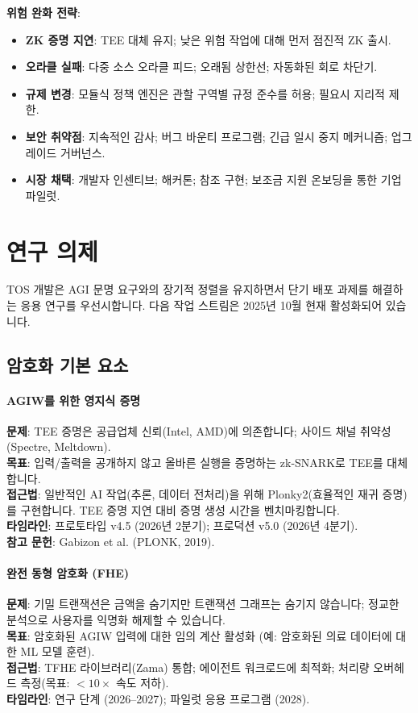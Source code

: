 \documentclass[11pt]{article}
\begin{document}
\textbf{위험 완화 전략}:
\begin{itemize}[noitemsep]
  \item \textbf{ZK 증명 지연}: TEE 대체 유지; 낮은 위험 작업에 대해 먼저 점진적 ZK 출시.
  \item \textbf{오라클 실패}: 다중 소스 오라클 피드; 오래됨 상한선; 자동화된 회로 차단기.
  \item \textbf{규제 변경}: 모듈식 정책 엔진은 관할 구역별 규정 준수를 허용; 필요시 지리적 제한.
  \item \textbf{보안 취약점}: 지속적인 감사; 버그 바운티 프로그램; 긴급 일시 중지 메커니즘; 업그레이드 거버넌스.
  \item \textbf{시장 채택}: 개발자 인센티브; 해커톤; 참조 구현; 보조금 지원 온보딩을 통한 기업 파일럿.
\end{itemize}

\section{연구 의제}
\label{sec:research}

TOS 개발은 AGI 문명 요구와의 장기적 정렬을 유지하면서 단기 배포 과제를 해결하는 응용 연구를 우선시합니다. 다음 작업 스트림은 2025년 10월 현재 활성화되어 있습니다.

\subsection{암호화 기본 요소}

\paragraph{AGIW를 위한 영지식 증명}
\textbf{문제}: TEE 증명은 공급업체 신뢰(Intel, AMD)에 의존합니다; 사이드 채널 취약성(Spectre, Meltdown).\\
\textbf{목표}: 입력/출력을 공개하지 않고 올바른 실행을 증명하는 zk-SNARK로 TEE를 대체합니다.\\
\textbf{접근법}: 일반적인 AI 작업(추론, 데이터 전처리)을 위해 Plonky2(효율적인 재귀 증명)를 구현합니다. TEE 증명 지연 대비 증명 생성 시간을 벤치마킹합니다.\\
\textbf{타임라인}: 프로토타입 v4.5 (2026년 2분기); 프로덕션 v5.0 (2026년 4분기).\\
\textbf{참고 문헌}: Gabizon et al. (PLONK, 2019).

\paragraph{완전 동형 암호화 (FHE)}
\textbf{문제}: 기밀 트랜잭션은 금액을 숨기지만 트랜잭션 그래프는 숨기지 않습니다; 정교한 분석으로 사용자를 익명화 해제할 수 있습니다.\\
\textbf{목표}: 암호화된 AGIW 입력에 대한 임의 계산 활성화 (예: 암호화된 의료 데이터에 대한 ML 모델 훈련).\\
\textbf{접근법}: TFHE 라이브러리(Zama) 통합; 에이전트 워크로드에 최적화; 처리량 오버헤드 측정(목표: $<10\times$ 속도 저하).\\
\textbf{타임라인}: 연구 단계 (2026--2027); 파일럿 응용 프로그램 (2028).
\end{document}
